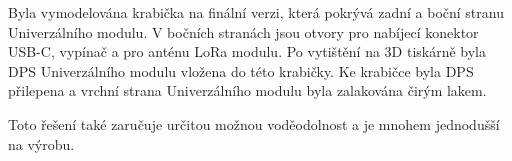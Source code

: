 Byla vymodelována krabička na finální verzi, která pokrývá zadní a boční stranu Univerzálního modulu. V bočních stranách jsou otvory pro nabíjecí konektor USB-C, vypínač a pro anténu LoRa modulu. Po vytištění 
na 3D tiskárně byla DPS Univerzálního modulu vložena do této krabičky. Ke krabičce byla DPS přilepena a vrchní strana Univerzálního modulu byla zalakována čirým lakem. 

Toto řešení také zaručuje určitou možnou voděodolnost a je mnohem jednodušší na výrobu. 




